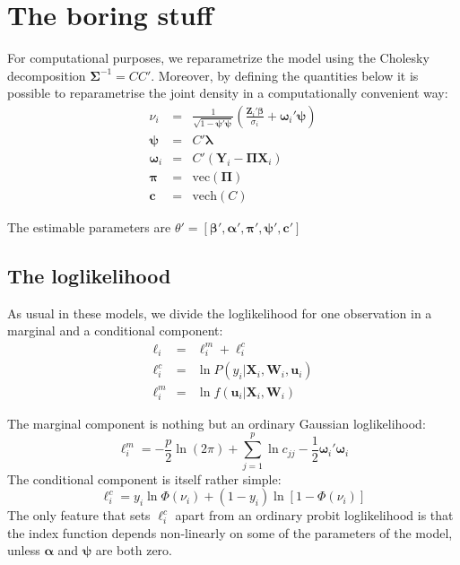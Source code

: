 \documentclass[a4paper,10pt]{article}
\newcommand{\HIP}{\texttt{HIP}}
\newcommand{\Depvar}{y_{i}}
\newcommand{\Endog}{\mathbf{Y}_{i}}
\newcommand{\Expla}{\mathbf{Z}_{i}}
\newcommand{\ExoInst}{\mathbf{X}_{i}}
\newcommand{\CSReg}{\mathbf{W}_{i}}
\newcommand{\RfDist}{\mathbf{u}_i}
\newcommand{\ScRfDist}{\bm{\omega}_i}
\newcommand{\ProbitPar}{\bm{\beta}}
\newcommand{\RfPar}{\bm{\Pi}}
\newcommand{\vRfPar}{\bm{\pi}}
\newcommand{\VarPar}{\bm{\alpha}}
\newcommand{\CondSig}{\sigma_i}
\newcommand{\Covars}{\bm{\lambda}}
\newcommand{\ScCov}{\bm{\psi}}
\newcommand{\RfVar}{\bm{\Sigma}}
\newcommand{\vechC}{\mathbf{c}}
\begin{document}

\section{The boring stuff}


For computational purposes, we reparametrize the model using the
Cholesky decomposition $\RfVar^{-1} = CC'$. Moreover, by defining the
quantities below it is possible to reparametrise the joint density in
a computationally convenient way:
\begin{eqnarray*}
  \nu_i & = & \frac{1}{\sqrt{1- \ScCov' \ScCov}}
  \left( \frac{\Expla'\ProbitPar}{\CondSig}  + \ScRfDist' \ScCov \right) \\
  \ScCov & = & C'\Covars \\
  \ScRfDist & = & C' \left(\Endog - \RfPar \ExoInst\right) \\
  \vRfPar & = & \mathrm{vec}\left(\RfPar\right) \\
  \vechC & = & \mathrm{vech}(C)
\end{eqnarray*}

The estimable parameters are $\theta' = \left[\ProbitPar', \VarPar',
  \vRfPar', \ScCov', \vechC' \right]$

\subsection{The loglikelihood}
\label{sec:loglik}

As usual in these models, we divide the loglikelihood for one
observation in a marginal and a conditional component:
\begin{eqnarray*}
  \ell_i & = & \ell^m_i + \ell^c_i \\
  \ell^c_i & = & \ln P(\Depvar | \ExoInst, \CSReg, \RfDist) \\
  \ell^m_i & = & \ln f(\RfDist | \ExoInst, \CSReg) 
\end{eqnarray*}

The marginal component is nothing but an ordinary Gaussian
loglikelihood:
\[
\ell^m_i = -\frac{p}{2}\ln(2\pi) + \sum_{j=1}^p \ln c_{jj} - 
\frac{1}{2}\ScRfDist' \ScRfDist
\]
The conditional component is itself rather simple:
\begin{equation}
  \ell^c_i = \Depvar \ln\Phi(\nu_i) + \left(1-\Depvar\right)
  \ln \left[1-\Phi\left(\nu_i \right)\right]
\end{equation}
The only feature that sets $\ell^c_i$ apart from an ordinary probit
loglikelihood is that the index function depends non-linearly on some
of the parameters of the model, unless $\VarPar$ and $\ScCov$ are both
zero.
\end{document}
